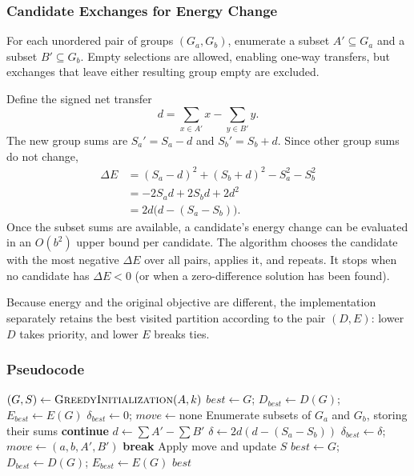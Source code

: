 \documentclass[11pt,a4paper]{article}
\begin{document}
\subsubsection{Candidate Exchanges for Energy Change}
For each unordered pair of groups $(G_a,G_b)$, enumerate a subset $A'\subseteq G_a$ and a subset $B'\subseteq G_b$. Empty selections are allowed, enabling one-way transfers, but exchanges that leave either resulting group empty are excluded.

Define the signed net transfer
\begin{equation}d=\sum_{x\in A'}x-\sum_{y\in B'}y.\end{equation}
The new group sums are $S_a'=S_a-d$ and $S_b'=S_b+d$. Since other group sums do not change,
\begin{align}
\Delta E&=(S_a-d)^2+(S_b+d)^2-S_a^2-S_b^2\\
&=-2S_ad+2S_bd+2d^2\\
&=2d\bigl(d-(S_a-S_b)\bigr).
\end{align}
Once the subset sums are available, a candidate's energy change can be evaluated in an $O(b^2)$ upper bound per candidate. The algorithm chooses the candidate with the most negative $\Delta E$ over all pairs, applies it, and repeats. It stops when no candidate has $\Delta E<0$ (or when a zero-difference solution has been found).

Because energy and the original objective are different, the implementation separately retains the best visited partition according to the pair $(D,E)$: lower $D$ takes priority, and lower $E$ breaks ties.

\newpage
\subsubsection{Pseudocode}
\begin{algorithm}[ht]
\caption{Energy-based subset-exchange search}
\begin{algorithmic}[1]
\State $(G,S)\gets\textsc{GreedyInitialization}(A,k)$
\State $best\gets G$; $D_{best}\gets D(G)$; $E_{best}\gets E(G)$
\State $\delta_{best}\gets0$; $move\gets\text{none}$
\State Enumerate subsets of $G_a$ and $G_b$, storing their sums
\State \textbf{continue}
\EndIf
\State $d\gets\sum A'-\sum B'$
\State $\delta\gets2d(d-(S_a-S_b))$
\State $\delta_{best}\gets\delta$; $move\gets(a,b,A',B')$
\EndIf
\EndFor
\EndFor
{}
\State \textbf{break}
\EndIf
\State Apply move and update $S$
\State $best\gets G$; $D_{best}\gets D(G)$; $E_{best}\gets E(G)$
\EndIf
\EndWhile
\State \Return $best$
\end{algorithmic}
\end{algorithm}
\end{document}
